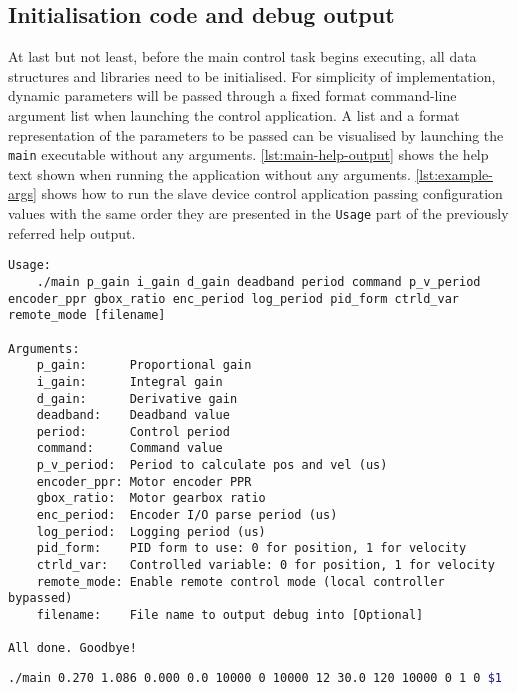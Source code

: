 \subsection{Initialisation code and debug output} \label{init-code}
At last but not least, before the main control task begins executing, all data structures and libraries need to be initialised.
For simplicity of implementation, dynamic parameters will be passed through a fixed format command-line argument list when launching the control application.
A list and a format representation of the parameters to be passed can be visualised by launching the \verb|main| executable without any arguments.
\autoref{lst:main-help-output} shows the help text shown when running the application without any arguments.
\autoref{lst:example-args} shows how to run the slave device control application passing configuration values with the same order they are presented in the \verb|Usage| part of the previously referred help output.

\begin{lstlisting}[float=htp,breaklines=true,caption=Output showing the help information,label=lst:main-help-output]
Usage:
	./main p_gain i_gain d_gain deadband period command p_v_period encoder_ppr gbox_ratio enc_period log_period pid_form ctrld_var remote_mode [filename]
	
Arguments:
	p_gain:      Proportional gain
	i_gain:      Integral gain
	d_gain:      Derivative gain
	deadband:    Deadband value
	period:      Control period
	command:     Command value
	p_v_period:  Period to calculate pos and vel (us)
	encoder_ppr: Motor encoder PPR
	gbox_ratio:  Motor gearbox ratio
	enc_period:  Encoder I/O parse period (us)
	log_period:  Logging period (us)
	pid_form:    PID form to use: 0 for position, 1 for velocity
	ctrld_var:   Controlled variable: 0 for position, 1 for velocity
	remote_mode: Enable remote control mode (local controller bypassed)
	filename:    File name to output debug into [Optional]
	
All done. Goodbye!
\end{lstlisting}

\begin{lstlisting}[float=htp,language=Bash,label=lst:example-args,caption=Example configuration values passed as arguments]
./main 0.270 1.086 0.000 0.0 10000 0 10000 12 30.0 120 10000 0 1 0 $1
\end{lstlisting}

